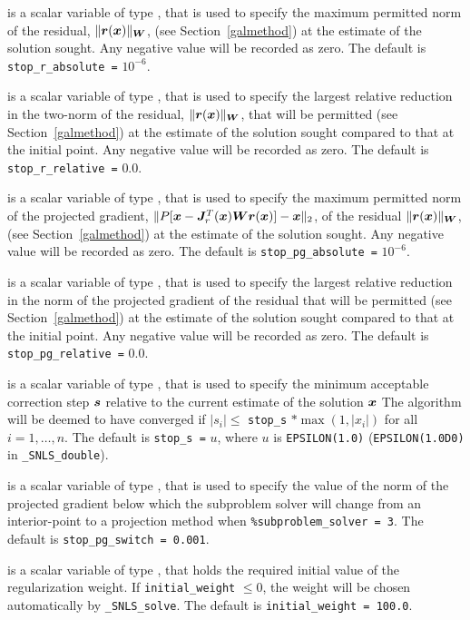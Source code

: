 \documentclass{galahad}
\newcommand{\packagename}{SNLS}
\newcommand{\fullpackagename}{\libraryname\_\packagename}
\newcommand{\solver}{{\tt \fullpackagename\_solve}}
\begin{document}
\begin{description}
 is a scalar variable of type \realdp,
that is used to specify the maximum permitted norm of the
residual, $\|{\bm{r}}({\bm{x}})\|_{{\bm{W}}}$,
(see Section~\ref{galmethod}) at the estimate of the solution sought.
Any negative value will be recorded as zero.
The default is {\tt stop\_r\_absolute =} $10^{-6}$.

 is a scalar variable of type \realdp,
that is used to specify the largest relative reduction in the two-norm of the
residual, $\|{\bm{r}}({\bm{x}})\|_{{\bm{W}}}$, that will be permitted
(see Section~\ref{galmethod}) at the estimate of the solution sought
compared to that at the initial point.
Any negative value will be recorded as zero.
The default is {\tt stop\_r\_relative =} $0.0$.

 is a scalar variable of type \realdp, that is used 
to specify the maximum permitted norm of the projected gradient,
$\|P[{\bm{x}} - {\bm{J}}_r^T({\bm{x}}) {\bm{W}} {\bm{r}}({\bm{x}})] - {\bm{x}}\|_2$,
of the residual  $\|{\bm{r}}({\bm{x}})\|_{{\bm{W}}}$,
(see Section~\ref{galmethod}) at the estimate of the solution sought.
Any negative value will be recorded as zero.
The default is {\tt stop\_pg\_absolute =} $10^{-6}$.

 is a scalar variable of type \realdp,
that is used to specify the largest relative reduction in the norm of the
projected gradient of the residual that will be permitted
(see Section~\ref{galmethod}) at the estimate of the solution sought
compared to that at the initial point.
Any negative value will be recorded as zero.
The default is {\tt stop\_pg\_relative =} $0.0$.

 is a scalar variable of type \realdp,
that is used to specify the minimum acceptable correction step ${\bm{s}}$
relative to the current estimate of the solution ${\bm{x}}$
The algorithm will be deemed to have converged if $|s_i| \leq$
{\tt stop\_s} $\ast \max( 1, |x_i|)$ for all $i = 1, \ldots, n$.
The default is {\tt stop\_s =} $u$,
where $u$ is {\tt EPSILON(1.0)} ({\tt EPSILON(1.0D0)} in
{\tt \fullpackagename\_double}).

 is a scalar variable of type \realdp, that is used 
to specify the value of the norm of the projected gradient below which
the subproblem solver will change from an interior-point to a projection 
method when {\tt \%subproblem\_solver = 3}. 
The default is {\tt stop\_pg\_switch = 0.001}.

 is a scalar variable of type \realdp, that holds
the required initial value of the regularization weight. If
{\tt initial\_weight} $\leq 0$, the weight will be chosen automatically
by \solver.
The default is {\tt initial\_weight = 100.0}.


\end{description}
\end{document}
